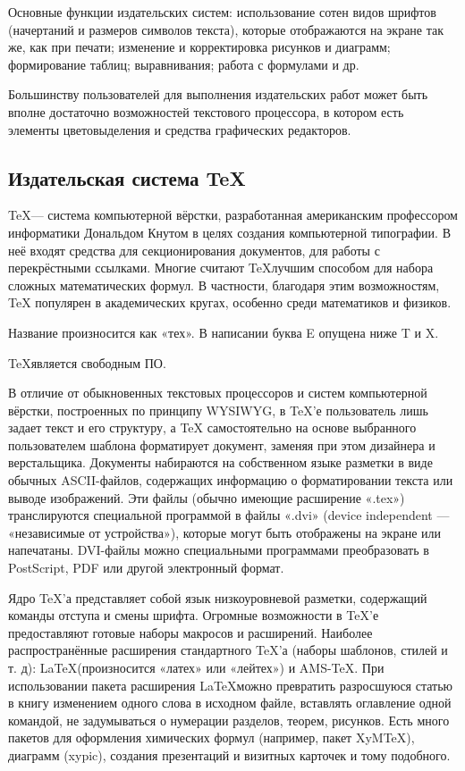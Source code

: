 \documentclass[a4paper,12pt]{article} %
\begin{document}
Основные функции издательских систем: использование сотен видов шрифтов (начертаний и размеров символов текста), которые отображаются на экране так же, как при печати; изменение и корректировка рисунков и диаграмм; формирование таблиц; выравнивания; работа с формулами и др.

Большинству пользователей для выполнения издательских работ может быть вполне достаточно возможностей текстового процессора, в котором есть элементы цветовыделения и средства графических редакторов.

\subsection*{Издательская система \TeX}


\hspace*{1cm} \TeX  — система компьютерной вёрстки, разработанная американским профессором информатики Дональдом Кнутом в целях создания компьютерной типографии. В неё входят средства для секционирования документов, для работы с перекрёстными ссылками. Многие считают \TeX  лучшим способом для набора сложных математических формул. В частности, благодаря этим возможностям, TeX популярен в академических кругах, особенно среди математиков и физиков.

Название произносится как «тех». В написании буква E опущена ниже T и X. 

\TeX  является свободным ПО.

В отличие от обыкновенных текстовых процессоров и систем компьютерной вёрстки, построенных по принципу WYSIWYG, в \TeX’е пользователь лишь задает текст и его структуру, а TeX самостоятельно на основе выбранного пользователем шаблона форматирует документ, заменяя при этом дизайнера и верстальщика. Документы набираются на собственном языке разметки в виде обычных ASCII-файлов, содержащих информацию о форматировании текста или выводе изображений. Эти файлы (обычно имеющие расширение «.tex») транслируются специальной программой в файлы «.dvi» (device independent — «независимые от устройства»), которые могут быть отображены на экране или напечатаны. DVI-файлы можно специальными программами преобразовать в PostScript, PDF или другой электронный формат.

Ядро \TeX’а представляет собой язык низкоуровневой разметки, содержащий команды отступа и смены шрифта. Огромные возможности в \TeX’е предоставляют готовые наборы макросов и расширений. Наиболее распространённые расширения стандартного \TeX’а (наборы шаблонов, стилей и т. д): \LaTeX  (произносится «латех» или «лейтех») и AMS-TeX. При использовании пакета расширения \LaTeX  можно превратить разросшуюся статью в книгу изменением одного слова в исходном файле, вставлять оглавление одной командой, не задумываться о нумерации разделов, теорем, рисунков. Есть много пакетов для оформления химических формул (например, пакет XyMTeX), диаграмм (xypic), создания презентаций и визитных карточек и тому подобного.
\end{document}
